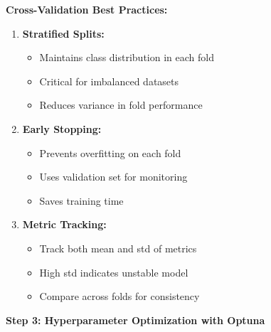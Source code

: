 \textbf{Cross-Validation Best Practices:}

\begin{enumerate}
    \item \textbf{Stratified Splits:}
    \begin{itemize}
        \item Maintains class distribution in each fold
        \item Critical for imbalanced datasets
        \item Reduces variance in fold performance
    \end{itemize}

    \item \textbf{Early Stopping:}
    \begin{itemize}
        \item Prevents overfitting on each fold
        \item Uses validation set for monitoring
        \item Saves training time
    \end{itemize}

    \item \textbf{Metric Tracking:}
    \begin{itemize}
        \item Track both mean and std of metrics
        \item High std indicates unstable model
        \item Compare across folds for consistency
    \end{itemize}
\end{enumerate}

\textbf{Step 3: Hyperparameter Optimization with Optuna}

